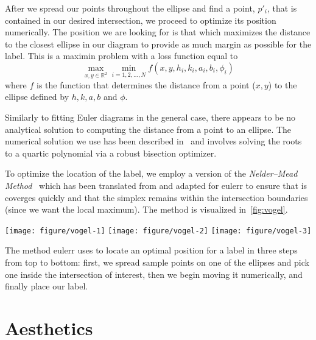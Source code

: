 \documentclass[
  oneside,
  openany,
  numbers=noendperiod,
  parskip=half,
  bibliography=totoc
]{scrbook}\usepackage[]{graphicx}\usepackage{xcolor}
\newenvironment{knitrout}{}{} %
\newcommand{\pkg}[1]{{\fontseries{b}\selectfont #1}}
\begin{document}
After we spread our points throughout the ellipse and find a point, $p'_i$, that
is contained in our desired intersection, we proceed to optimize its position
numerically. The position we are looking for is that which maximizes the
distance to the closest ellipse in our diagram to provide as much margin as
possible for the label. This is a maximin problem with a loss function equal to
\begin{equation}
\max_{x,y \in \mathbb{R}^2} \min_{i=1,2,\dots,N} f(x,y,h_i,k_i,a_i,b_i,\phi_i)
\label{eq:lossDist}
\end{equation}
where $f$ is the function that determines the distance from a point ($x,y$) to the ellipse defined by $h,k,a,b$ and $\phi$.

Similarly to fitting Euler diagrams in the general case, there appears to be no
analytical solution to computing the distance from a point to an ellipse. The
numerical solution we use has been described in~\citet{Eberly_2016a} and
involves solving the roots to a quartic polynomial via a robust
bisection optimizer.

To optimize the location of the label, we employ a version of the
\emph{Nelder--Mead Method}~\citep{Nelder_1965} which has been translated from
\citet{Kelley_1999} and adapted for \pkg{eulerr} to ensure that is coverges
quickly and that the simplex remains within the intersection boundaries
(since we want the local maximum). The method is visualized in~\cref{fig:vogel}.
\begin{marginfigure}
\begin{knitrout}\small
{}\color{fgcolor}

{\centering \texttt{[image: figure/vogel-1]}
\texttt{[image: figure/vogel-2]}
\texttt{[image: figure/vogel-3]}

}



\end{knitrout}
\caption{The method eulerr uses to locate an optimal position for a label in
three steps from top to bottom: first, we spread sample points on one of the
ellipses and pick one inside the intersection of interest, then we begin moving
it numerically, and finally place our label.}
\label{fig:vogel}
\end{marginfigure}

\section{Aesthetics}
\label{sec:aesthetics}
\end{document}
